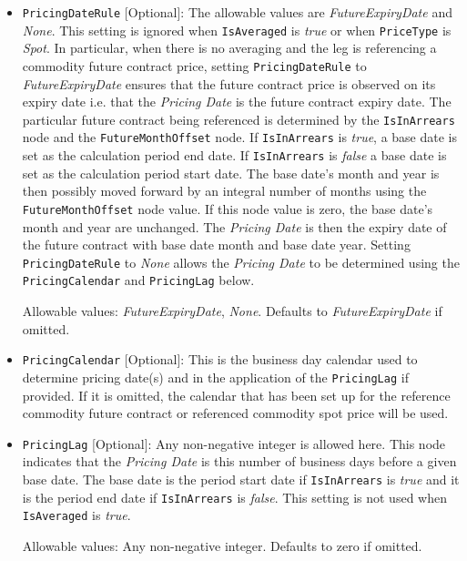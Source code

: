 \begin{itemize}
\item
\lstinline!PricingDateRule! [Optional]: The allowable values are \emph{FutureExpiryDate} and \emph{None}. This setting is ignored when \lstinline!IsAveraged! is \emph{true}  or when \lstinline!PriceType! is \emph{Spot}. In particular, when there is no averaging and the leg is referencing a commodity future contract price, setting \lstinline!PricingDateRule! to \emph{FutureExpiryDate} ensures that the future contract price is observed on its expiry date i.e. that the \textit{Pricing Date} is the future contract expiry date. The particular future contract being referenced is determined by the \lstinline!IsInArrears! node and the \lstinline!FutureMonthOffset! node. If \lstinline!IsInArrears! is  \emph{true}, a base date is set as the calculation period end date. If \lstinline!IsInArrears! is  \emph{false} a base date is set as the calculation period start date. The base date's month and year is then possibly moved forward by an integral number of months using the \lstinline!FutureMonthOffset! node value. If this node value is zero, the base date's month and year are unchanged. The \textit{Pricing Date} is then the expiry date of the future contract with base date month and base date year. Setting \lstinline!PricingDateRule! to \emph{None} allows the \textit{Pricing Date} to be determined using the \lstinline!PricingCalendar! and \lstinline!PricingLag! below.

Allowable values:  \emph{FutureExpiryDate}, \emph{None}. Defaults to \emph{FutureExpiryDate} if omitted.

\item
\lstinline!PricingCalendar! [Optional]: This is the business day calendar used to determine pricing date(s) and in the application of the \lstinline!PricingLag! if provided. If it is omitted, the calendar that has been set up for the reference commodity future contract or referenced commodity spot price will be used.

\item
\lstinline!PricingLag! [Optional]: Any non-negative integer is allowed here. This node indicates that the \textit{Pricing Date} is this number of business days before a given base date. The base date is the period start date if \lstinline!IsInArrears! is \emph{true} and it is the period end date if \lstinline!IsInArrears! is \emph{false}. This setting is not used when \lstinline!IsAveraged! is \emph{true}.

Allowable values: Any non-negative integer. Defaults to zero if omitted.


\end{itemize}
